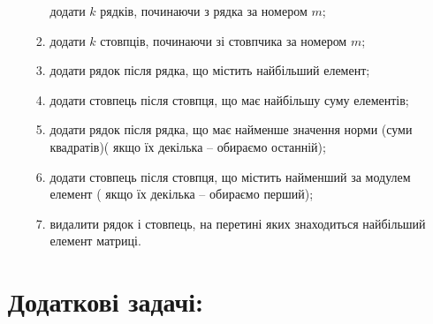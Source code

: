\documentclass[a5paper,titlepage,openany,twoside,
]
{book_unv}%
\makeatletter
\newcommand{\xslalph}[1]{\expandafter\@xslalph\csname c@#1\endcsname}
\newcommand{\@xslalph}[1]{%
    \ifcase#1\or а\or б\or в\or г\or д\or e\or є\or ж\or з\or i%
    \or й\or к\or л\or м\or н\or о\or п\or р\or с\or т%
    \or у\or ф\or х\or ц\or ч\or ш\or ю\or я\or аа\or бб\or вв%
    \else\@ctrerr\fi%
}
\makeatother
\begin{document}
\begin{enumerate}
\begin{enumerate}
\begin{enumerate}[label=\xslalph*)]
  додати $k$ рядків, починаючи з рядка за номером $m$;
\item
  додати $k$ стовпців, починаючи зі стовпчика за номером $m$;
\item
  додати рядок після рядка, що містить найбільший елемент;
\item
  додати стовпець після стовпця, що має найбільшу суму елементів;
\item
  додати рядок після рядка, що має найменше значення норми (суми квадратів)(
якщо їх декілька -- обираємо останній);
\item
  додати стовпець після стовпця, що містить найменший за модулем елемент (
якщо їх декілька -- обираємо перший);
\item
  видалити рядок і стовпець, на перетині яких знаходиться найбільший
  елемент матриці.
\end{enumerate}

\end{enumerate}

\section{Додаткові задачі:}


\end{enumerate}
\end{document}
